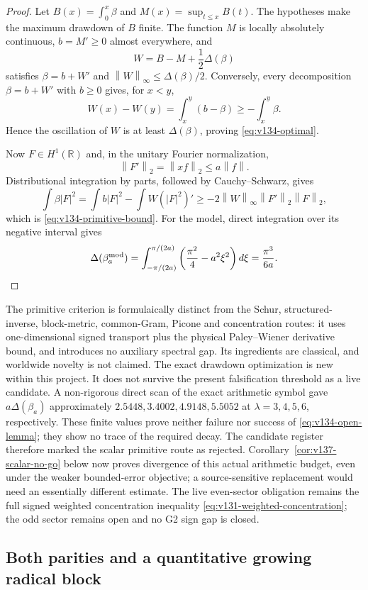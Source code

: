 \documentclass[11pt]{article}
\theoremstyle{remark}
\newcommand{\norm}[1]{\left\lVert #1\right\rVert}
\begin{document}
\begin{proof}
Let $B(x)=\int_0^x\beta$ and
$M(x)=\sup_{t\le x}B(t)$.  The hypotheses make the maximum drawdown of
$B$ finite.  The function $M$ is locally absolutely continuous,
$b=M'\ge0$ almost everywhere, and
\[
 W=B-M+\frac12\Delta(\beta)
\]
satisfies $\beta=b+W'$ and
$\norm W_\infty\le\Delta(\beta)/2$.  Conversely, every decomposition
$\beta=b+W'$ with $b\ge0$ gives, for $x<y$,
\[
 W(x)-W(y)=\int_x^y(b-\beta)
 \ge-\int_x^y\beta.
\]
Hence the oscillation of $W$ is at least $\Delta(\beta)$, proving
\eqref{eq:v134-optimal}.

Now $F\in H^1(\mathbb R)$ and, in the unitary Fourier normalization,
\[
 \norm{F'}_2=\norm{xf}_2\le a\norm f.
\]
Distributional integration by parts, followed by Cauchy--Schwarz,
gives
\[
 \int\beta|F|^2
 =\int b|F|^2-\int W(|F|^2)'
 \ge-2\norm W_\infty\norm{F'}_2\norm F_2,
\]
which is \eqref{eq:v134-primitive-bound}.  For the model, direct
integration over its negative interval gives
\[
 \Delta(\beta_a^{\rm mod})
 =\int_{-\pi/(2a)}^{\pi/(2a)}
   \left(\frac{\pi^2}{4}-a^2\xi^2\right)d\xi
 =\frac{\pi^3}{6a}.
\]
\end{proof}

The primitive criterion is formulaically distinct from the Schur,
structured-inverse, block-metric, common-Gram, Picone and concentration
routes: it uses one-dimensional signed transport plus the physical
Paley--Wiener derivative bound, and introduces no auxiliary spectral
gap.  Its ingredients are classical, and worldwide novelty is not
claimed.  The exact drawdown optimization is new within this project.
It does not survive the present falsification threshold as a live
candidate.  A non-rigorous direct scan of the exact arithmetic symbol
gave $a\Delta(\beta_a)$ approximately $2.5448,3.4002,4.9148,5.5052$
at $\lambda=3,4,5,6$, respectively.  These finite values prove neither
failure nor success of \eqref{eq:v134-open-lemma}; they show no trace of
the required decay.  The candidate register therefore marked the scalar
primitive route as rejected. Corollary~\ref{cor:v137-scalar-no-go}
below now proves divergence of this actual arithmetic budget, even
under the weaker bounded-error objective; a source-sensitive replacement
would need an essentially different estimate.  The live even-sector obligation remains the full
signed weighted concentration inequality
\eqref{eq:v131-weighted-concentration}; the odd sector remains open and
no G2 sign gap is closed.

\subsection*{Both parities and a quantitative growing radical block}
\end{document}
